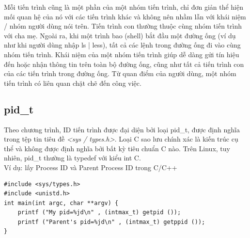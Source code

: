 \documentclass[a4paper,10pt]{report}
\begin{document}
Mỗi tiến trình cũng là một phần của một nhóm tiến trình, chỉ đơn giản thể hiện mối quan hệ của nó với các tiến trình khác và không nên nhầm lẫn với khái niệm / nhóm người dùng nói trên. Tiến trình con thường thuộc cùng nhóm tiến trình với cha mẹ. Ngoài ra, khi một trình bao (shell) bắt đầu một đường ống (ví dụ như khi người dùng nhập ls | less), tất cả các lệnh trong đường ống đi vào cùng nhóm tiến trình. Khái niệm của một nhóm tiến trình giúp dễ dàng gửi tín hiệu đến hoặc nhận thông tin trên toàn bộ đường ống, cũng như tất cả tiến trình con của các tiến trình trong đường ống. Từ quan điểm của người dùng, một nhóm tiến trình có liên quan chặt chẽ đến công việc.
\subsection{pid\_t}
Theo chương trình, ID tiến trình được đại diện bởi loại pid\_t, được định nghĩa trong tệp tin tiêu đề \textit{<sys / types.h>}. Loại C sao lưu chính xác là kiến trúc cụ thể và không được định nghĩa bởi bất kỳ tiêu chuẩn C nào. Trên Linux, tuy nhiên, pid\_t thường là typedef với kiểu int C. \\
Ví dụ: lấy Process ID và  Parent Process ID trong C/C++
\begin{center}
\begin{lstlisting}
#include <sys/types.h>
#include <unistd.h>
int main(int argc, char **argv) {
	printf ("My pid=%jd\n" , (intmax_t) getpid ());
	printf ("Parent's pid=%jd\n" , (intmax_t) getppid ());
}
\end{lstlisting}
\end{center}
\end{document}

